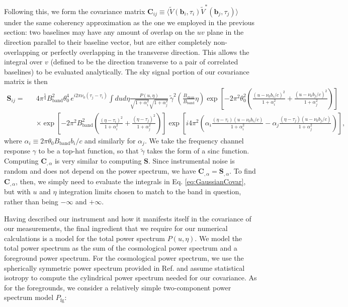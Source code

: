 \documentclass[twocolumn,aps,prd,nofootinbib,showpacs]{revtex4-1}
\begin{document}
\begin{widetext}
Following this, we form the covariance matrix $\mathbf{C}_{ij} \equiv \langle \widetilde{V} (\mathbf{b}_i, \tau_i) \widetilde{V}^* (\mathbf{b}_j, \tau_j) \rangle$ under the same coherency approximation as the one we employed in the previous section: two baselines may have any amount of overlap on the $uv$ plane in the direction parallel to their baseline vector, but are either completely non-overlapping or perfectly overlapping in the transverse direction.  This allows the integral over $v$ (defined to be the direction transverse to a pair of correlated baselines) to be evaluated analytically.  The sky signal portion of our covariance matrix is then
\begin{eqnarray}
\label{eq:GaussianCovar}
\mathbf{S}_{ij} = && 4 \pi^\frac{5}{4} B_\textrm{band}^2 \theta_0^4 \, e^{i 2 \pi \nu_0 (\tau_j - \tau_i)} \int du d\eta \frac{P(u,\eta) }{\sqrt{1+ \alpha_i^2} \sqrt{1+ \alpha_j^2}} \,\widetilde{\gamma}^2 \!\left( \frac{B_\textrm{chan}}{B_\textrm{band} } \eta \right) \exp \left[ - 2 \pi^2 \theta_0^2 \left( \frac{\left(u - \nu_0 b_i / c\right)^2}{1+ \alpha_i^2} + \frac{\left(u - \nu_0 b_j / c\right)^2}{1+ \alpha_j^2} \right)\right] \nonumber \\
&& \times \exp \left[ - 2 \pi^2 B_\textrm{band}^2 \left( \frac{\left( \eta - \tau_i \right)^2}{1+ \alpha_i^2} + \frac{\left( \eta - \tau_j \right)^2}{1+ \alpha_j^2} \right)\right] \exp \left[ i 4 \pi^2 \left( \alpha_i  \frac{\left( \eta - \tau_i \right)  \left(u - \nu_0 b_i / c\right) }{1+ \alpha_i^2} - \alpha_j  \frac{\left( \eta - \tau_j \right)  \left(u - \nu_0 b_j / c\right)}{1+ \alpha_j^2} \right)\right], \qquad 
\end{eqnarray}
where $\alpha_i \equiv 2\pi \theta_0 B_\textrm{band} b_i / c$ and similarly for $\alpha_j$.  We take the frequency channel response $\gamma$ to be a top-hat function, so that $\widetilde{\gamma}$ takes the form of a sinc function.  Computing $\mathbf{C}_{,\alpha}$ is very similar to computing $\mathbf{S}$.  Since instrumental noise is random and does not depend on the power spectrum, we have $\mathbf{C}_{,\alpha} = \mathbf{S}_{,\alpha}$.  To find $\mathbf{C}_{,\alpha}$, then, we simply need to evaluate the integrals in Eq. \eqref{eq:GaussianCovar}, but with $u$ and $\eta$ integration limits chosen to match to the band in question, rather than being $-\infty$ and $+\infty$.
\end{widetext}
Having described our instrument and how it manifests itself in the covariance of our measurements, the final ingredient that we require for our numerical calculations is a model for the total power spectrum $P(u,\eta)$.  We model the total power spectrum as the sum of the cosmological power spectrum and a foreground power spectrum.  For the cosmological power spectrum, we use the spherically symmetric power spectrum provided in Ref. \cite{Barkana2009} and assume statistical isotropy to compute the cylindrical power spectrum needed for our covariance.  As for the foregrounds, we consider a relatively simple two-component power spectrum model $P_\textrm{fg}$:
\end{document}
